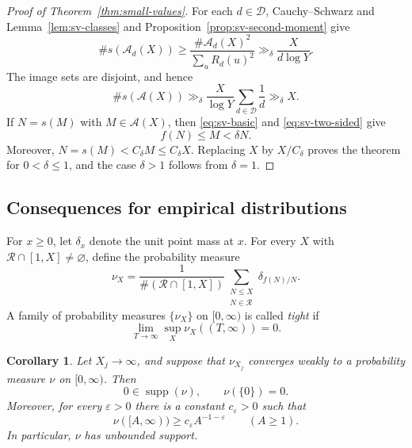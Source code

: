 \documentclass[11pt]{article}
\newtheorem{corollary}[theorem]{Corollary}
\theoremstyle{remark}
\newcommand{\N}{\mathbb N}
\newcommand{\Rcal}{\mathcal R}
\newcommand{\eps}{\varepsilon}
\newcommand{\1}{\mathbf 1}
\DeclareMathOperator{\supp}{supp}
\begin{document}
\begin{proof}[Proof of Theorem~\ref{thm:small-values}]
For each $d\in\mathcal D$, Cauchy--Schwarz and
Lemma~\ref{lem:sv-classes} and Proposition~\ref{prop:sv-second-moment} give
\[
  \#s(\mathcal A_d(X))
  \geq\frac{\#\mathcal A_d(X)^2}{\sum_uR_d(u)^2}
  \gg_\delta\frac{X}{d\log Y}.
\]
The image sets are disjoint, and hence
\[
  \#s(\mathcal A(X))
  \gg_\delta\frac{X}{\log Y}
       \sum_{d\in\mathcal D}\frac1d
  \gg_\delta X.
\]
If $N=s(M)$ with $M\in\mathcal A(X)$, then
\eqref{eq:sv-basic} and \eqref{eq:sv-two-sided} give
\[
  f(N)\leq M<\delta N.
\]
Moreover, $N=s(M)<C_\delta M\leq C_\delta X$.  Replacing $X$ by $X/C_\delta$ proves the theorem
for $0<\delta\leq1$, and the case $\delta>1$ follows from $\delta=1$.
\end{proof}

\subsection{Consequences for empirical distributions}

For $x\geq0$, let $\delta_x$ denote the unit point mass at $x$.  For every
$X$ with $\Rcal\cap[1,X]\ne\varnothing$, define the probability measure
\begin{equation}\label{eq:empirical-measures}
 \nu_X=\frac1{\#(\Rcal\cap[1,X])}
 \sum_{\substack{N\leq X\\N\in\Rcal}}\delta_{f(N)/N}.
\end{equation}
A family of probability measures $\{\nu_X\}$ on $[0,\infty)$ is called
\emph{tight} if
\[
 \lim_{T\to\infty}\sup_X\nu_X((T,\infty))=0.
\]

\begin{corollary}\label{cor:limit-law-tails}
Let $X_j\to\infty$, and suppose that $\nu_{X_j}$ converges weakly to a
probability measure $\nu$ on $[0,\infty)$.  Then
\[
 0\in\supp(\nu),\qquad \nu(\{0\})=0.
\]
Moreover, for every $\eps>0$ there is a constant $c_\eps>0$ such that
\[
 \nu([A,\infty))\geq c_\eps A^{-1-\eps}
 \qquad(A\geq1).
\]
In particular, $\nu$ has unbounded support.
\end{corollary}
\end{document}
